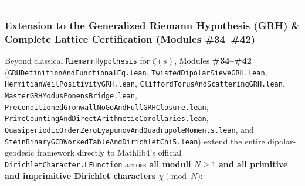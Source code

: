 \documentclass[
  11pt,
]{article}
\begin{document}
\begin{center}\rule{0.5\linewidth}{0.5pt}\end{center}

\subsubsection{Extension to the Generalized Riemann Hypothesis (GRH) \&
Complete Lattice Certification (Modules
\#34--\#42)}\label{extension-to-the-generalized-riemann-hypothesis-grh-complete-lattice-certification-modules-3442}

Beyond classical \texttt{RiemannHypothesis} for \(\zeta(s)\), Modules
\textbf{\#34--\#42} (\texttt{GRHDefinitionAndFunctionalEq.lean},
\texttt{TwistedDipolarSieveGRH.lean},
\texttt{HermitianWeilPositivityGRH.lean},
\texttt{CliffordTorusAndScatteringGRH.lean},
\texttt{MasterGRHModusPonensBridge.lean},
\texttt{PreconditionedGronwallNoGoAndFullGRHClosure.lean},
\texttt{PrimeCountingAndDirectArithmeticCorollaries.lean},
\texttt{QuasiperiodicOrderZeroLyapunovAndQuadrupoleMoments.lean}, and
\texttt{SteinBinaryGCDWorkedTableAndDirichletChi5.lean}) extend the
entire dipolar-geodesic framework directly to Mathlib4's official
\texttt{DirichletCharacter.LFunction} across \textbf{all moduli
\(N \ge 1\) and all primitive and imprimitive Dirichlet characters
\(\chi \pmod N\)}:
\end{document}
